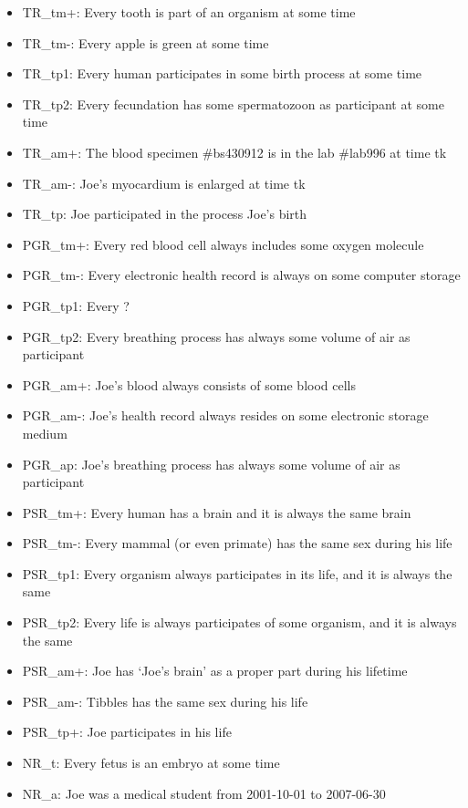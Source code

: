 \begin{itemize}
\item TR\_tm+: Every tooth is part of an organism at some time
\item TR\_tm-: Every apple is green at some time
\item TR\_tp1: Every human participates in some birth process at some time
\item TR\_tp2: Every fecundation has some spermatozoon as participant at some time
\item TR\_am+: The blood specimen \#bs430912 is in  the lab \#lab996 at time tk
\item TR\_am-: Joe's myocardium is enlarged at time tk
\item TR\_tp:  Joe participated in the process Joe's birth

\item PGR\_tm+: Every red blood cell always includes some oxygen molecule 
\item PGR\_tm-: Every electronic health record is always on some computer storage
\item PGR\_tp1: Every ?  
\item PGR\_tp2: Every breathing process has always some volume of air as participant 
\item PGR\_am+: Joe's blood always consists of some blood cells 
\item PGR\_am-: Joe's health record always resides on some electronic storage medium
\item PGR\_ap:  Joe's breathing process has always some volume of air as participant

\item PSR\_tm+: Every human has a brain and it is always the same brain
\item PSR\_tm-: Every mammal (or even primate) has the same sex during his life 
\item PSR\_tp1: Every organism always participates in its life, and it is always the same
\item PSR\_tp2: Every life is always participates of some organism, and it is always the same
\item PSR\_am+: Joe has `Joe's brain' as a proper part during his lifetime 
\item PSR\_am-: Tibbles has the same sex during his life 
\item PSR\_tp+: Joe participates in his life

\item NR\_t: Every fetus is an embryo at some time
\item NR\_a: Joe was a medical student from 2001-10-01 to 2007-06-30


\end{itemize}

